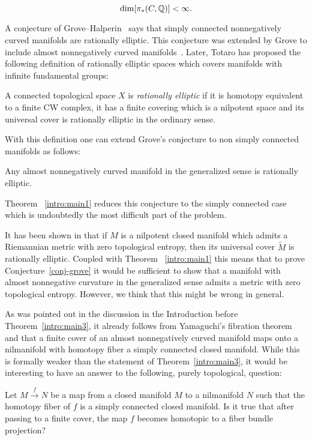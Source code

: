 \documentclass{amsart}
\begin{document}
\[
\dim [\pi_*(C,{\Bbb Q})]<\infty.
\]




A conjecture of Grove--Halperin~\cite{GH} says that simply connected nonnegatively curved manifolds are rationally elliptic. 
This conjecture was extended by Grove to include almost nonnegatively curved manifolds~\cite{Grv}.
Later, Totaro has proposed the following definition of  rationally elliptic spaces which covers manifolds with infinite fundamental groups:

A connected topological space $X$ is \emph{rationally elliptic}
if it is homotopy equivalent to a finite CW complex,
it has a finite covering which is a nilpotent space
and its universal cover is rationally elliptic in the ordinary sense.

With this definition one can extend Grove's conjecture  
to non simply connected manifolds as follows:

\begin{conj}\label{conj-grove}
Any almost nonnegatively curved manifold in the generalized sense is rationally elliptic.
\end{conj}

Theorem ~\ref{intro:main1}  reduces this conjecture to the simply connected case which is undoubtedly the most difficult part of the problem.



It has been shown in \cite{PaPe} that if $M$ is a nilpotent closed manifold which admits a Riemannian metric with zero topological entropy, then its universal cover $\tilde{M}$ is rationally elliptic.
Coupled with  Theorem ~\ref{intro:main1} this means that to prove Conjecture~\ref{conj-grove} it would be sufficient to show that a manifold with almost nonnegative curvature in
the
generalized sense admits a metric with zero topological entropy.
However, we think that this
 might be wrong in general.

\medskip

As was pointed out in the discussion in the Introduction before Theorem~\ref{intro:main3},  it already follows from Yamaguchi's fibration theorem
and \cite{FY}
that a finite cover of an almost nonnegatively curved manifold maps onto a nilmanifold
  with homotopy fiber a simply connected closed manifold.
While this is formally weaker than the statement of Theorem~\ref{intro:main3}, it would be interesting to
have an answer to the following, purely topological, question:


\begin{quest}
Let $ M \overset{f}{\longrightarrow} N$ be a map from a  closed manifold $M$
to  a nilmanifold $N$ such that  the homotopy fiber of $f$ is  a simply connected closed manifold.
Is it true that after passing to a finite cover, the map
$f$ becomes homotopic to a fiber bundle projection?
\end{quest}
\end{document}
